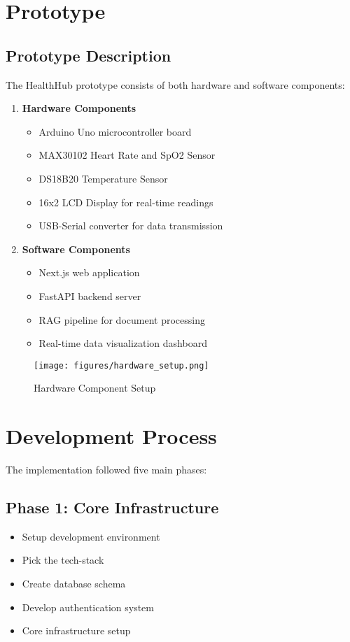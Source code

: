 \section{Prototype}

\subsection{Prototype Description}
The HealthHub prototype consists of both hardware and software components:

\begin{enumerate}
    \item \textbf{Hardware Components}
    \begin{itemize}
        \item Arduino Uno microcontroller board
        \item MAX30102 Heart Rate and SpO2 Sensor
        \item DS18B20 Temperature Sensor
        \item 16x2 LCD Display for real-time readings
        \item USB-Serial converter for data transmission
    \end{itemize}

    \item \textbf{Software Components}
    \begin{itemize}
        \item Next.js web application
        \item FastAPI backend server
        \item RAG pipeline for document processing
        \item Real-time data visualization dashboard
    \end{itemize}
\end{enumerate}

\begin{figure}[H]
    \centering
    \texttt{[image: figures/hardware\_setup.png]}
    \caption{Hardware Component Setup}
\end{figure}

\section{Development Process}
The implementation followed five main phases:

\subsection{Phase 1: Core Infrastructure}
\begin{itemize}
    \item Setup development environment
    \item Pick the tech-stack
    \item Create database schema
    \item Develop authentication system
    \item Core infrastructure setup
\end{itemize}

